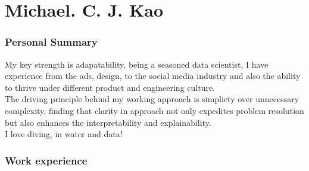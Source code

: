 \documentclass{tccv}
\begin{document}
\part{Michael. C. J. Kao}



\vspace{0.5cm}

\section{Personal Summary}

My key strength is adapatability, being a seasoned data scientist, I have
experience from the ads, design, to the social media industry and also the
ability to thrive under different product and engineering culture.\\


The driving principle behind my working approach is simplicty over unnecessary
complexity, finding that clarity in approach not only expedites problem
resolution but also enhances the interpretability and explainability. \\

I love diving, in water and data!



\section{Work experience}
\end{document}
